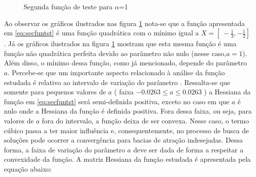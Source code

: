 \begin{figure}[h!]
    \centering 
    \qquad
    \qquad
    \caption{Segunda função de teste para $\alpha$=1}%
    \label{fig:secfun0}%
\end{figure}
\FloatBarrier

Ao observar os gráficos ilustrados nas figura \ref{fig:secfun0} nota-se que a função apresentada em \ref{eq:secfuntst} é uma função quadrática com o mínimo igual a $X =[\ -\frac{1}{3} , -\frac{1}{2} ]\ $. Já os gráficos ilustrados na figura \ref{fig:secfun0} mostram que esta mesma função é uma função não quadrática perfeita devido ao parâmetro não nulo (nesse caso,$a=1$). Além disso, o mínimo dessa função, como já mencionado, depende do parâmetro $a$.
Percebe-se que um importante aspecto relacionado à análise da função estudada é relativo ao intervalo de variação do parâmetro . Ressalta-se que somente para pequenos valores de $a$ ( faixa $-0.0263\leq a \leq 0.0263$ ) a Hessiana da função em \ref{eq:secfuntst} será semi-definida positiva, exceto no caso em que $a$ é nulo onde a Hessiana da função é definida positiva. Fora dessa faixa, ou seja, para valores de $a$ fora do intervalo, a função deixa de ser convexa. Nesse caso, o termo cúbico passa a ter maior influência e, consequentemente, no processo de busca de soluções pode ocorrer a convergência para bacias de atração indesejadas. Dessa forma, a faixa de variação do parâmetro $a$ deve ser dada de forma a respeitar a convexidade da função.
A matriz Hessiana da função estudada é apresentada pela equação abaixo:

